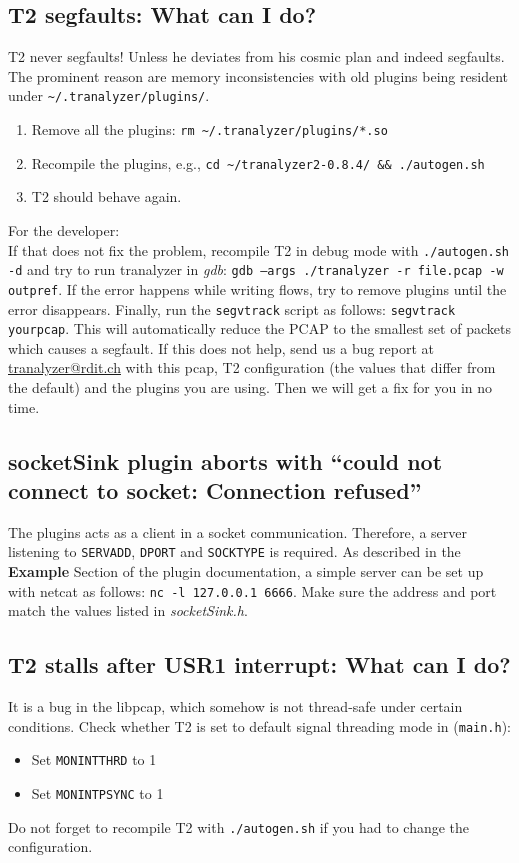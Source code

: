 \documentclass[documentation]{subfiles}
\begin{document}
\subsection{T2 segfaults: What can I do?}
T2 never segfaults!
Unless he deviates from his cosmic plan and indeed segfaults.
The prominent reason are memory inconsistencies with old plugins being resident under {\tt\textasciitilde{}/.tranalyzer/plugins/}.
\begin{enumerate}
    \item Remove all the plugins: {\tt rm \textasciitilde{}/.tranalyzer/plugins/*.so}
    \item Recompile the plugins, e.g., {\tt cd \textasciitilde{}/tranalyzer2-0.8.4/ \&\& ./autogen.sh}
    \item T2 should behave again.
\end{enumerate}
For the developer: \\
If that does not fix the problem, recompile T2 in debug mode with {\tt ./autogen.sh -d} and try to run tranalyzer in {\em gdb}: {\tt gdb --args ./tranalyzer -r file.pcap -w outpref}.
If the error happens while writing flows, try to remove plugins until the error disappears.
Finally, run the {\tt segvtrack} script as follows: {\tt segvtrack yourpcap}.
This will automatically reduce the PCAP to the smallest set of packets which causes a segfault.
If this does not help, send us a bug report at \href{mailto:tranalyzer@rdit.ch}{tranalyzer@rdit.ch} with this pcap, T2 configuration (the values that differ from the default) and the plugins you are using.
Then we will get a fix for you in no time.

\subsection{socketSink plugin aborts with ``could not connect to socket: Connection refused''}
The  plugins acts as a client in a socket communication.
Therefore, a server listening to {\tt SERVADD}, {\tt DPORT} and {\tt SOCKTYPE} is required.
As described in the {\bf Example} Section of the  plugin documentation,
a simple server can be set up with netcat as follows: {\tt nc -l 127.0.0.1 6666}.
Make sure the address and port match the values listed in {\em socketSink.h}.

\subsection{T2 stalls after USR1 interrupt: What can I do?}
It is a bug in the libpcap, which somehow is not thread-safe under certain conditions.
Check whether T2 is set to default signal threading mode in ({\tt main.h}):
\begin{itemize}
    \item Set {\tt MONINTTHRD} to 1
    \item Set {\tt MONINTPSYNC} to 1
\end{itemize}
Do not forget to recompile T2 with {\tt ./autogen.sh} if you had to change the configuration.\\
\end{document}
